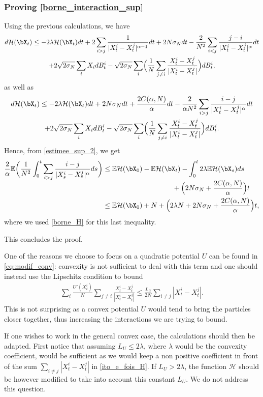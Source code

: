 \subsubsection*{Proving \eqref{borne_interaction_sup}} Using the previous calculations, we have
\begin{multline*}
d\mathcal{H}(\bX_t)\leq -2\lambda \mathcal{H}(\bX_t)dt+2\sum_{i>j}\frac{1}{|X^i_t-X^j_t|^{\alpha-1}}dt+2N\sigma_Ndt-\frac{2}{N^2}\sum_{i<j}\frac{j-i}{|X^i_t-X^j_t|^\alpha}dt\\
+2\sqrt{2\sigma_N}\sum_iX_idB^i_t-\sqrt{2\sigma_N}\sum_i\Bigl(\frac{1}{N}\sum_{j\neq i}\frac{X^i_t-X^j_t}{|X^i_t-X^j_t|}\Bigr)dB^i_t,
\end{multline*}
as well as
\begin{multline}
d\mathcal{H}(\bX_t)\leq -2\lambda \mathcal{H}(\bX_t)dt+2N\sigma_Ndt+\frac{2C(\alpha,N)}{\alpha}dt-\frac{2}{\alpha N^2}\sum_{i>j}\frac{i-j}{|X^i_t-X^j_t|^{\alpha}}dt\\
+2\sqrt{2\sigma_N}\sum_iX_idB^i_t-\sqrt{2\sigma_N}\sum_i\Bigl(\frac{1}{N}\sum_{j\neq i}\frac{X^i_t-X^j_t}{|X^i_t-X^j_t|}\Bigr)dB^i_t\label{estimee_sup_2}.
\end{multline}
Hence, from \eqref{estimee_sup_2}, we get
\begin{align*}
\frac{2}{\alpha}\mathbb{E}\biggl(\frac{1}{N^2}\int_0^t\sum_{i>j}\frac{i-j}{|X^i_s-X^j_s|^{\alpha}}ds\biggr)&\leq \mathbb{E}\mathcal{H}(\bX_0)-\mathbb{E}\mathcal{H}(\bX_t)-\int_0^t2\lambda\mathbb{E}\mathcal{H}(\bX_s)ds\\[-5pt]
&\hspace*{3.5cm}+\Bigl(2N\sigma_N+\frac{2C(\alpha,N)}{\alpha}\Bigr)t\\
&\leq \mathbb{E}\mathcal{H}(\bX_0)+N+\Bigl(2\lambda N+2N\sigma_N+\frac{2C(\alpha,N)}{\alpha}\Bigr)t,
\end{align*}
where we used \eqref{borne_H} for this last inequality.

This concludes the proof.

\begin{remark}\label{rem:modif_conv}
One of the reasons we choose to focus on a quadratic potential $U$ can be found in \eqref{eq:modif_conv}: convexity is not sufficient to deal with this term and one should instead use the Lipschitz condition to bound
\begin{align*}
\sum_i\frac{U'\left(X^i_t\right)}{N}\sum_{j\neq i}\frac{X^i_t-X^j_t}{|X^i_t-X^j_t|}\leq\frac{L_U}{2N}\sum_{i\neq j}|X^i_t-X^j_t|.
\end{align*}
This is not surprising as a convex potential $U$ would tend to bring the particles closer together, thus increasing the interactions we are trying to bound.

If one wishes to work in the general convex case, the calculations should then be adapted. First notice that assuming $L_U\leq 2\lambda$, where $\lambda$ would be the convexity coefficient, would be sufficient as we would keep a non positive coefficient in front of the sum $\sum_{i\neq j}|X^i_t-X^j_t|$ in \eqref{ito_e_fois_H}. If $L_U> 2\lambda$, the function $\mathcal{H}$ should be however modified to take into account this constant $L_U$. We do not address this question.
\end{remark}

